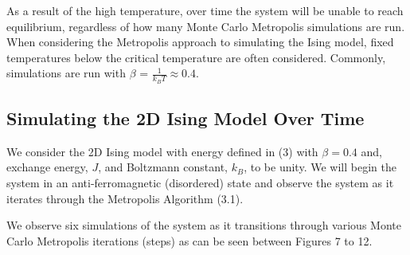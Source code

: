 \documentclass[a4paper]{article}
\begin{document}
As a result of the high temperature, over time the system will be unable to reach equilibrium, regardless of how many Monte Carlo Metropolis simulations are run. When considering the Metropolis approach to simulating the Ising model, fixed temperatures below the critical temperature are often considered. Commonly, simulations are run with $\beta$ = $\frac{1}{k_{B}T} \approx 0.4$.

\subsection{Simulating the 2D Ising Model Over Time}

We consider the 2D Ising model with energy defined in (3) with $\beta = 0.4$ and, exchange energy, $J$, and Boltzmann constant, $k_{B}$, to be unity. We will begin the system in an anti-ferromagnetic (disordered) state and observe the system as it iterates through the Metropolis Algorithm (3.1).

We observe six simulations of the system as it transitions through various Monte Carlo Metropolis iterations (steps) as can be seen between Figures 7 to 12.
\end{document}

